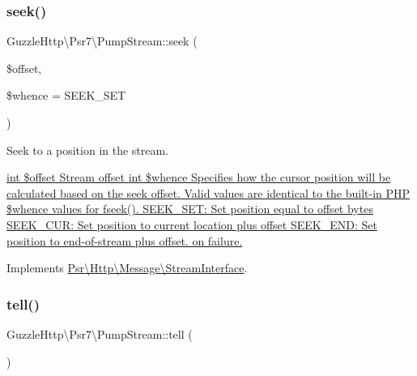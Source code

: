 \mbox{\label{classGuzzleHttp_1_1Psr7_1_1PumpStream_a9245d47aa4ba82439759d407115e4c5a}} 
\subsubsection{\texorpdfstring{seek()}{seek()}}
{\footnotesize\ttfamily Guzzle\+Http\textbackslash{}\+Psr7\textbackslash{}\+Pump\+Stream\+::seek (\begin{DoxyParamCaption}\item[{}]{\$offset,  }\item[{}]{\$whence = {\ttfamily SEEK\+\_\+SET} }\end{DoxyParamCaption})}

Seek to a position in the stream.

\hyperlink{}{int \$offset Stream offset  int \$whence Specifies how the cursor position will be calculated based on the seek offset. Valid values are identical to the built-\/in P\+HP \$whence values for {\ttfamily fseek()}. S\+E\+E\+K\+\_\+\+S\+E\+T\+: Set position equal to offset bytes S\+E\+E\+K\+\_\+\+C\+U\+R\+: Set position to current location plus offset S\+E\+E\+K\+\_\+\+E\+N\+D\+: Set position to end-\/of-\/stream plus offset.   on failure. }

Implements \hyperlink{interfacePsr_1_1Http_1_1Message_1_1StreamInterface_a96ee062dc6cf4022d655dd15eaa81208}{Psr\textbackslash{}\+Http\textbackslash{}\+Message\textbackslash{}\+Stream\+Interface}.

\mbox{\label{classGuzzleHttp_1_1Psr7_1_1PumpStream_af59623b18ca8aec9aa2bbe09b1a3778e}} 
\subsubsection{\texorpdfstring{tell()}{tell()}}
{\footnotesize\ttfamily Guzzle\+Http\textbackslash{}\+Psr7\textbackslash{}\+Pump\+Stream\+::tell (\begin{DoxyParamCaption}{ }\end{DoxyParamCaption})}


